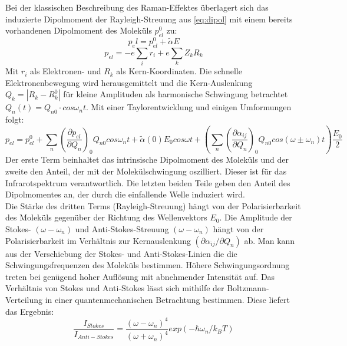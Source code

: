 \documentclass[.../bericht]{subfilies}
\begin{document}
      Bei der klassischen Beschreibung des Raman-Effektes überlagert sich das induzierte Dipolmoment der Rayleigh-Streuung aus \cref{eq:dipol} mit einem bereits vorhandenen Dipolmoment des Moleküls $p_{el}^0$ zu:
      \begin{equation*}
        p_el=p_{el}^0+\widetilde{\alpha} E
      \end{equation*}
      \begin{equation*}
      p_{el}=-e\sum_i r_i+e\sum_k Z_k R_k
      \end{equation*}
      Mit $r_i$ als Elektronen- und $R_k$ als Kern-Koordinaten.
      Die schnelle Elektronenbewegung wird herausgemittelt und die Kern-Auslenkung $Q_k=|R_k-R_k^0|$ für kleine Amplituden als harmonische Schwingung betrachtet $Q_n(t)=Q_{n0}\cdot cos\omega_n t$. Mit einer Taylorentwicklung und einigen Umformungen folgt:
      \begin{equation}
        p_{el}=p_{el}^0+\sum_n (\frac{\partial p_{el}}{\partial Q_n})_0 Q_{n0}cos\omega_n t+\widetilde{\alpha}(0) E_0 cos\omega t+(\sum_n (\frac{\partial \alpha_{ij}}{\partial Q_n})_0 Q_{n0}cos(\omega \pm \omega_n)t)\frac{E_0}{2}
        \label{eq:gesamtdipolmoment}
      \end{equation}
      Der erste Term beinhaltet das intrinsische Dipolmoment des Moleküls und der zweite den Anteil, der mit der Molekülschwingung oszilliert. Dieser ist für das Infrarotspektrum verantwortlich. Die letzten beiden Teile geben den Anteil des Dipolmomentes an, der durch die einfallende Welle induziert wird.\\
      Die Stärke des dritten Terms (Rayleigh-Streuung) hängt von der Polarisierbarkeit des Moleküls gegenüber der Richtung des Wellenvektors $E_0$.
      Die Amplitude der Stokes- $(\omega-\omega_n)$ und Anti-Stokes-Streuung $(\omega-\omega_n)$ hängt von der Polarisierbarkeit im Verhältnis zur Kernauslenkung $(\partial \alpha_{ij} / \partial Q_n)$ ab. Man kann aus der Verschiebung der Stokes- und Anti-Stokes-Linien die die Schwingungsfrequenzen des Moleküls bestimmen. Höhere Schwingungsordnung treten bei genügend hoher Auflösung mit abnehmender Intensität auf. Das Verhältnis von Stokes und Anti-Stokes lässt sich mithilfe der Boltzmann-Verteilung in einer quantenmechanischen Betrachtung bestimmen. Diese liefert das Ergebnis:
      \begin{equation}
        \frac{I_{Stokes}}{I_{Anti-Stokes}}=\frac{(\omega-\omega_n)^4}{(\omega+\omega_n)^4}exp(-\hbar \omega_n/ k_B T)
        \label{eq:stokesvergleich}
      \end{equation}
\end{document}
